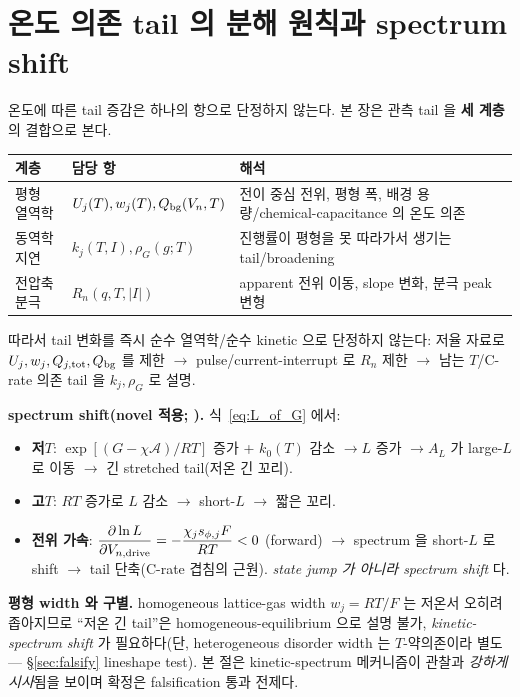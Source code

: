 \section{온도 의존 tail 의 분해 원칙과 spectrum shift}\label{sec:tailT}
온도에 따른 tail 증감은 하나의 항으로 단정하지 않는다. 본 장은 관측 tail 을 \textbf{세 계층}의 결합으로 본다.
\begin{longtable}{p{} p{} p{}}
\toprule 계층 & 담당 항 & 해석 \\ \midrule \endhead
평형 열역학 & $U_j(T),w_j(T),Q_{\mathrm{bg}}(V_n,T)$ & 전이 중심 전위, 평형 폭, 배경 용량/chemical-capacitance 의 온도 의존 \\
동역학 지연 & $k_j(T,I),\rho_G(g;T)$ & 진행률이 평형을 못 따라가서 생기는 tail/broadening \\
전압축 분극 & $R_n(q,T,|I|)$ & apparent 전위 이동, slope 변화, 분극 peak 변형 \\
\bottomrule
\end{longtable}
따라서 tail 변화를 즉시 순수 열역학/순수 kinetic 으로 단정하지 않는다: 저율 자료로 $U_j,w_j,Q_{j,\mathrm{tot}},Q_{\mathrm{bg}}$
를 제한 $\to$ pulse/current-interrupt 로 $R_n$ 제한 $\to$ 남는 $T$/C-rate 의존 tail 을 $k_j,\rho_G$ 로 설명.

\textbf{spectrum shift(novel 적용; ).} 식~\eqref{eq:L_of_G} 에서:
\begin{itemize}[leftmargin=1.4em]
\item \textbf{저$T$}: $\exp[(G-\chi\mathcal A)/RT]$ 증가 + $k_0(T)$ 감소 $\to L$ 증가 $\to A_L$ 가 large-$L$
  로 이동 $\to$ 긴 stretched tail(저온 긴 꼬리).
\item \textbf{고$T$}: $RT$ 증가로 $L$ 감소 $\to$ short-$L$ $\to$ 짧은 꼬리.
\item \textbf{전위 가속}: $\dfrac{\partial\ln L}{\partial V_{n,\mathrm{drive}}}=-\dfrac{\chi_j s_{\phi,j}F}{RT}<0$
  (forward) $\to$ spectrum 을 short-$L$ 로 shift $\to$ tail 단축(C-rate 겹침의 근원). \emph{state jump 가
  아니라 spectrum shift} 다.
\end{itemize}
\textbf{평형 width 와 구별.} homogeneous lattice-gas width $w_j=RT/F$ 는 저온서 오히려 좁아지므로 ``저온
긴 tail''은 homogeneous-equilibrium 으로 설명 불가, \emph{kinetic-spectrum shift} 가 필요하다(단,
heterogeneous disorder width 는 $T$-약의존이라 별도 — \S\ref{sec:falsify} lineshape test). 본 절은
kinetic-spectrum 메커니즘이 관찰과 \emph{강하게 시사}됨을 보이며 확정은 falsification 통과 전제다.

